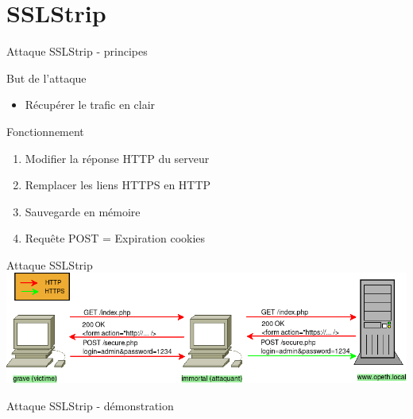 \section{SSLStrip}


\begin{frame}[fragile]{Attaque SSLStrip - principes}
  \begin{block}{But de l'attaque}
    \begin{itemize}
    \item Récupérer le trafic en clair
    \end{itemize}
  \end{block}
  \begin{block}{Fonctionnement}
    \begin{enumerate}
      \item Modifier la réponse HTTP du serveur
      \item Remplacer les liens HTTPS en HTTP
      \item Sauvegarde en mémoire
      \item Requête POST = Expiration cookies
    \end{enumerate}
  \end{block}
\end{frame}


\begin{frame}{Attaque SSLStrip}
    \includegraphics[width=\linewidth]{../medias/sslstrip/attack.png}
\end{frame}


\begin{frame}{Attaque SSLStrip - démonstration}
\end{frame}
